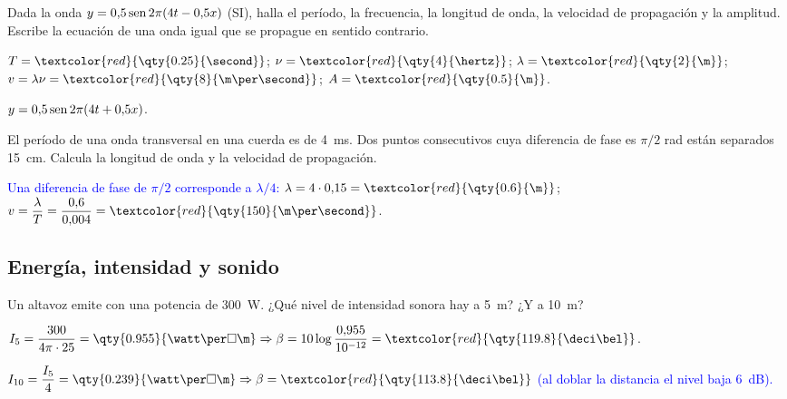 \begin{exercise}
    Dada la onda \(y = 0{,}5\operatorname{sen} 2\pi(4t - 0{,}5x)\) (SI), halla el período, la frecuencia, la longitud de onda, la velocidad de
    propagación y la amplitud. Escribe la ecuación de una onda igual que se propague en sentido contrario.
    \begin{solu}
        \(T = \textcolor{red}{\qty{0.25}{\second}}\); \(\nu = \textcolor{red}{\qty{4}{\hertz}}\); \(\lambda = \textcolor{red}{\qty{2}{\m}}\);
        \(v = \lambda\nu = \textcolor{red}{\qty{8}{\m\per\second}}\); \(A = \textcolor{red}{\qty{0.5}{\m}}\).

        \textcolor{red}{\(y = 0{,}5\operatorname{sen} 2\pi(4t + 0{,}5x)\)}.
    \end{solu}
\end{exercise}

\begin{exercise}
    El período de una onda transversal en una cuerda es de \qty{4}{\ms}. Dos puntos consecutivos cuya diferencia de fase es
    \(\pi/2\) rad están separados \qty{15}{\cm}. Calcula la longitud de onda y la velocidad de propagación.
    \begin{solu}
        \textcolor{blue}{Una diferencia de fase de \(\pi/2\) corresponde a \(\lambda/4\):} \(\lambda = 4\cdot 0{,}15 = \textcolor{red}{\qty{0.6}{\m}}\);
        \(v = \dfrac{\lambda}{T} = \dfrac{0{,}6}{0{,}004} = \textcolor{red}{\qty{150}{\m\per\second}}\).
    \end{solu}
\end{exercise}

\subsection{Energía, intensidad y sonido}

\begin{exercise}
    Un altavoz emite con una potencia de \qty{300}{\watt}. ¿Qué nivel de intensidad sonora hay a \qty{5}{\m}? ¿Y a \qty{10}{\m}?
    \begin{solu}
        \(I_5 = \dfrac{300}{4\pi\cdot 25} = \qty{0.955}{\watt\per\square\m} \Rightarrow \beta = 10\log\dfrac{0{,}955}{10^{-12}} = \textcolor{red}{\qty{119.8}{\deci\bel}}\).

        \(I_{10} = \dfrac{I_5}{4} = \qty{0.239}{\watt\per\square\m} \Rightarrow \beta = \textcolor{red}{\qty{113.8}{\deci\bel}}\)
        \textcolor{blue}{(al doblar la distancia el nivel baja \qty{6}{\deci\bel}).}
    \end{solu}
\end{exercise}

